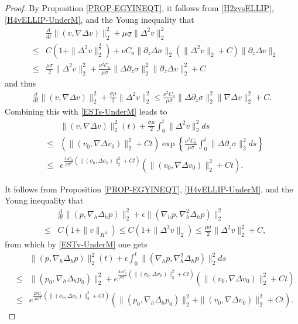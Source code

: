\documentclass[12pt,reqno]{amsart}
\numberwithin{equation}{section}
\begin{document}
\begin{proof}
By Proposition \ref{PROP-EGYINEQT}, it follows from \eqref{H2zvsELLIP}, \eqref{H4vELLIP-UnderM}, and the Young inequality that
\begin{eqnarray*}
  &&\frac{d}{dt}\|(v,\nabla\Delta v)\|_2^2+\mu\underline\sigma\|\Delta^2v\|_2^2\\
  &\leq& C\left(1+\|\Delta^2v\|_2^\frac32\right)+\nu{C_a}\|\partial_z\Delta\sigma\|_2(\|\Delta^2v\|_2+C)\|\partial_z\Delta v\|_2\\
  &\leq& \frac{\mu\underline\sigma}{2}\|\Delta^2v\|_2^2+\frac{\nu^2{C_a}}{\mu\underline\sigma}\|\Delta\partial_z\sigma\|_2^2
  \|\partial_z\Delta v\|_2^2+C
\end{eqnarray*}
and thus
\begin{eqnarray*}
  \frac{d}{dt}\|(v,\nabla\Delta v)\|_2^2+\frac{\underline\sigma \mu}{2}\|\Delta^2v\|_2^2
   \leq  \frac{\nu^2{C_a}}{\mu\underline\sigma}\|\Delta\partial_z\sigma\|_2^2\|\nabla\Delta v\|_2^2+C.
\end{eqnarray*}
Combining this with \eqref{ESTs-UnderM} leads to
\begin{eqnarray}
  &&\|(v,\nabla\Delta v)\|_2^2(t)+\frac{\underline\sigma \mu}{2}\int_0^t\|\Delta^2v\|_2^2ds\nonumber\\
  &\leq& (\|(v_0,\nabla\Delta v_0)\|_2^2+Ct)\exp\left\{\frac{\nu^2{C_a}}{\mu\underline\sigma}\int_0^t\|\Delta\partial_z\sigma\|_2^2 ds \right\}\nonumber\\
  &\leq& e^{\frac{2\nu{C_a}}{\mu\underline\sigma^2}(\|(\sigma_0,\Delta\sigma_0)\|_2^2+Ct) }(\|(v_0,\nabla\Delta v_0)\|_2^2+Ct).
  \label{ESTv-UnderM}
\end{eqnarray}

It follows from Proposition \ref{PROP-EGYINEQT}, \eqref{H4vELLIP-UnderM}, and the Young inequality that
\begin{eqnarray*}
  &&\frac{d}{dt}\|(p,\nabla_h\Delta_hp)\|_2^2+\epsilon\|(\nabla_hp,\nabla_h^2\Delta_hp)\|_2^2\\
  &\leq&C(1+\|v\|_{H^4})\leq C(1+\|\Delta^2v\|_2)
  \leq \frac{ \mu\underline\sigma}{2}\|\Delta^2v\|_2^2+C,
\end{eqnarray*}
from which by \eqref{ESTv-UnderM} one gets
\begin{eqnarray}
&&\|(p,\nabla_h\Delta_hp)\|_2^2(t)+\epsilon\int_0^t\|(\nabla_hp,\nabla_h^2\Delta_hp)\|_2^2ds\nonumber\\
&\leq&\|(p_0,\nabla_h\Delta_hp_0)\|_2^2+ e^{\frac{2\nu {C_a}}{\mu\underline\sigma^2}(\|(\sigma_0,\Delta\sigma_0)\|_2^2+Ct) }(\|(v_0,\nabla\Delta v_0)\|_2^2+Ct)\nonumber\\
&\leq& e^{\frac{2\nu {C_a}}{\mu\underline\sigma^2}(\|(\sigma_0,\Delta\sigma_0)\|_2^2+Ct) }(\|(p_0,\nabla_h\Delta_hp_0)\|_2^2+\|(v_0,\nabla\Delta v_0)\|_2^2+Ct).
\label{ESTp-UnderM}
\end{eqnarray}


\end{proof}
\end{document}
